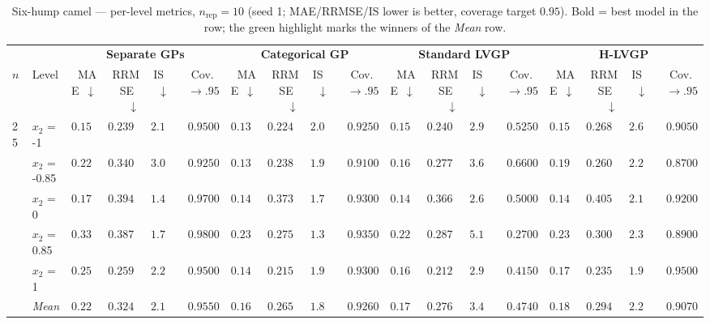 \begin{table}[htbp]
\centering
\scriptsize
\setlength{\tabcolsep}{2.5pt}
\setlength{\fboxsep}{1pt}
\caption{Six-hump camel --- per-level metrics, $n_{\mathrm{rep}}=10$ (seed 1; MAE/RRMSE/IS lower is better, coverage target $0.95$). Bold = best model in the row; the green highlight marks the winners of the \emph{Mean} row.}
\label{tab:sixhump_camel_nrep10}
\begin{tabular}{llrrrrrrrrrrrrrrrr}
\toprule
 & & \multicolumn{4}{c}{\textbf{Separate GPs}} & \multicolumn{4}{c}{\textbf{Categorical GP}} & \multicolumn{4}{c}{\textbf{Standard LVGP}} & \multicolumn{4}{c}{\textbf{H-LVGP}} \\
\cmidrule(lr){3-6} \cmidrule(lr){7-10} \cmidrule(lr){11-14} \cmidrule(lr){15-18}
$n$ & Level & MAE~$\downarrow$ & RRMSE~$\downarrow$ & IS~$\downarrow$ & Cov.~$\to.95$ & MAE~$\downarrow$ & RRMSE~$\downarrow$ & IS~$\downarrow$ & Cov.~$\to.95$ & MAE~$\downarrow$ & RRMSE~$\downarrow$ & IS~$\downarrow$ & Cov.~$\to.95$ & MAE~$\downarrow$ & RRMSE~$\downarrow$ & IS~$\downarrow$ & Cov.~$\to.95$ \\
\midrule
\multirow{6}{*}{25} & $x_2$ = -1 & $0.1576$ & $0.2399$ & $2.147$ & {\boldmath$0.9500$} & {\boldmath$0.1375$} & {\boldmath$0.2240$} & {\boldmath$2.087$} & $0.9250$ & $0.1597$ & $0.2405$ & $2.904$ & $0.5250$ & $0.1513$ & $0.2686$ & $2.655$ & $0.9050$ \\
 & $x_2$ = -0.85 & $0.2272$ & $0.3401$ & $3.011$ & {\boldmath$0.9250$} & {\boldmath$0.1391$} & {\boldmath$0.2381$} & {\boldmath$1.936$} & $0.9100$ & $0.1641$ & $0.2773$ & $3.695$ & $0.6600$ & $0.1938$ & $0.2606$ & $2.273$ & $0.8700$ \\
 & $x_2$ = 0 & $0.1736$ & $0.3946$ & {\boldmath$1.491$} & $0.9700$ & $0.1434$ & $0.3738$ & $1.718$ & {\boldmath$0.9300$} & {\boldmath$0.1410$} & {\boldmath$0.3669$} & $2.630$ & $0.5000$ & $0.1474$ & $0.4058$ & $2.109$ & $0.9200$ \\
 & $x_2$ = 0.85 & $0.3342$ & $0.3871$ & $1.770$ & $0.9800$ & $0.2369$ & {\boldmath$0.2755$} & {\boldmath$1.398$} & {\boldmath$0.9350$} & {\boldmath$0.2241$} & $0.2874$ & $5.190$ & $0.2700$ & $0.2301$ & $0.3005$ & $2.306$ & $0.8900$ \\
 & $x_2$ = 1 & $0.2530$ & $0.2595$ & $2.216$ & {\boldmath$0.9500$} & {\boldmath$0.1460$} & $0.2154$ & {\boldmath$1.906$} & $0.9300$ & $0.1632$ & {\boldmath$0.2122$} & $2.988$ & $0.4150$ & $0.1781$ & $0.2352$ & $1.976$ & $0.9500$ \\
 & \textit{Mean} & $0.2291$ & $0.3243$ & $2.127$ & \colorbox{green!20}{\boldmath$0.9550$} & \colorbox{green!20}{\boldmath$0.1606$} & \colorbox{green!20}{\boldmath$0.2654$} & \colorbox{green!20}{\boldmath$1.809$} & $0.9260$ & $0.1704$ & $0.2768$ & $3.481$ & $0.4740$ & $0.1801$ & $0.2942$ & $2.264$ & $0.9070$ \\

\end{tabular}
\end{table}

